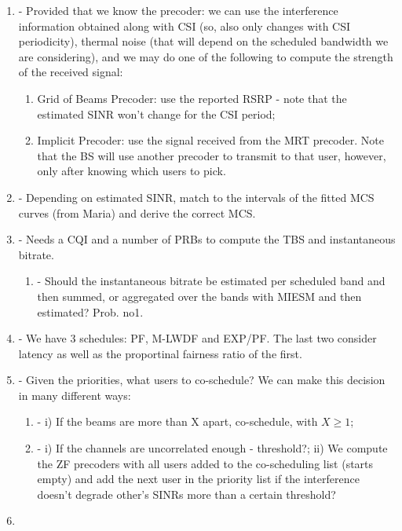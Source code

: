 \begin{enumerate}
    \item {} - Provided that we know the precoder: we can use the interference information obtained along with CSI (so, also only changes with CSI periodicity), thermal noise (that will depend on the scheduled bandwidth we are considering), and we may do one of the following to compute the strength of the received signal:
    \begin{enumerate}[label=\roman*]
        \item Grid of Beams Precoder: use the reported RSRP - note that the estimated SINR won't change for the CSI period;
        \item Implicit Precoder: use the signal received from the MRT precoder. Note that the BS will use another precoder to transmit to that user, however, only after knowing which users to pick.
    \end{enumerate}

    \item {} - Depending on estimated SINR, match to the intervals of the fitted MCS curves (from Maria) and derive the correct MCS.

    \item {} -  Needs a CQI and a number of PRBs to compute the TBS and instantaneous bitrate.
    
        \begin{enumerate}
            \item {} - Should the instantaneous bitrate be estimated per scheduled band and then summed, or aggregated over the bands with MIESM and then estimated? Prob. no1.
        \end{enumerate}


    \item {} - We have 3 schedules: PF, M-LWDF and EXP/PF. The last two consider latency as well as the proportinal fairness ratio of the first.
    


    \item {} - Given the priorities, what users to co-schedule? We can make this decision in many different ways:
    \begin{enumerate}
        \item {} - i) If the beams are more than X apart, co-schedule, with $ X \geq 1$; 
        \item {} - i) If the channels are uncorrelated enough - threshold?; ii) We compute the ZF precoders with all users added to the co-scheduling list (starts empty) and add the next user in the priority list if the interference doesn't degrade other's SINRs more than a certain threshold?
    \end{enumerate}

    \item 
\end{enumerate}

